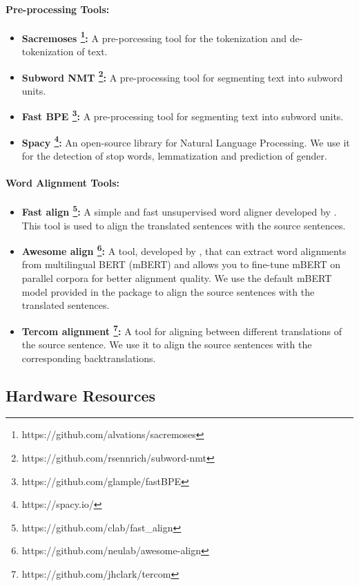 \paragraph{Pre-processing Tools:}
\begin{itemize}
    \item \textbf{Sacremoses \footnote{https://github.com/alvations/sacremoses}:} A pre-porcessing tool for the tokenization and de-tokenization of text.
    \item \textbf{Subword NMT \footnote{https://github.com/rsennrich/subword-nmt}:} A pre-processing tool for segmenting text into subword units. %
    \item \textbf{Fast BPE \footnote{https://github.com/glample/fastBPE}:} A pre-processing tool for segmenting text into subword units. %
    \item \textbf{Spacy \footnote{https://spacy.io/}:} An open-source library for Natural Language Processing. We use it for the detection of stop words, lemmatization and prediction of gender.
\end{itemize}

\paragraph{Word Alignment Tools:}
\begin{itemize}
    \item \textbf{Fast align \footnote{https://github.com/clab/fast\_align}:} A simple and fast unsupervised word aligner developed by \citet{fast-align}. This tool is used to align the translated sentences with the source sentences.
    \item \textbf{Awesome align \footnote{https://github.com/neulab/awesome-align}:} A tool, developed by \citet{awesome-align}, that can extract word alignments from multilingual BERT (mBERT) and allows you to fine-tune mBERT on parallel corpora for better alignment quality. We use the default mBERT model provided in the package to align the source sentences with the translated sentences.
    \item \textbf{Tercom alignment \footnote{https://github.com/jhclark/tercom}:} A tool for aligning between different translations of the source sentence. We use it to align the source sentences with the corresponding backtranslations.
\end{itemize}

\subsection{Hardware Resources}
\label{sec:Experiments:Hardware}

